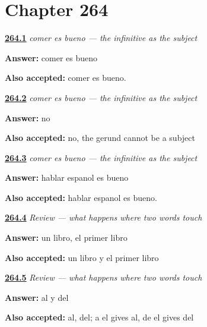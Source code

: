 \section*{Chapter 264}

\noindent\begin{minipage}[t]{\linewidth}
\raggedright
\hyperlink{review-ES-C67-comer-es-bueno-say}{\textbf{264.1}} \emph{comer es bueno — the infinitive as the subject}\par
\small \textbf{Answer:} comer es bueno\par
\footnotesize \textbf{Also accepted:} comer es bueno.
\end{minipage}\par\medskip

\noindent\begin{minipage}[t]{\linewidth}
\raggedright
\hyperlink{review-ES-C67-comer-es-bueno-trap}{\textbf{264.2}} \emph{comer es bueno — the infinitive as the subject}\par
\small \textbf{Answer:} no\par
\footnotesize \textbf{Also accepted:} no, the gerund cannot be a subject
\end{minipage}\par\medskip

\noindent\begin{minipage}[t]{\linewidth}
\raggedright
\hyperlink{review-ES-C67-comer-es-bueno-long}{\textbf{264.3}} \emph{comer es bueno — the infinitive as the subject}\par
\small \textbf{Answer:} hablar espanol es bueno\par
\footnotesize \textbf{Also accepted:} hablar espanol es bueno.
\end{minipage}\par\medskip

\noindent\begin{minipage}[t]{\linewidth}
\raggedright
\hyperlink{review-ES-C67-repaso-cuando-dos-palabras-se-tocan-corte}{\textbf{264.4}} \emph{Review — what happens where two words touch}\par
\small \textbf{Answer:} un libro, el primer libro\par
\footnotesize \textbf{Also accepted:} un libro y el primer libro
\end{minipage}\par\medskip

\noindent\begin{minipage}[t]{\linewidth}
\raggedright
\hyperlink{review-ES-C67-repaso-cuando-dos-palabras-se-tocan-fusion}{\textbf{264.5}} \emph{Review — what happens where two words touch}\par
\small \textbf{Answer:} al y del\par
\footnotesize \textbf{Also accepted:} al, del; a el gives al, de el gives del
\end{minipage}\par\medskip

